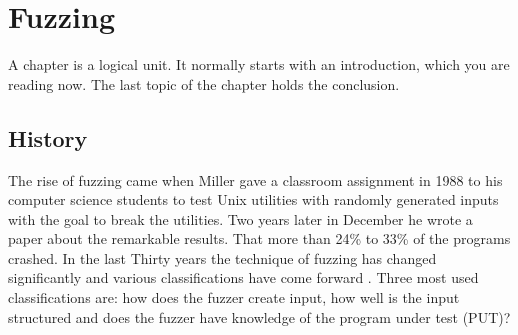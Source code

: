 \chapter{Fuzzing}
\label{cha:2:fuzzing}
A chapter is a logical unit. It normally starts with an introduction, which
you are reading now. The last topic of the chapter holds the conclusion.

%


\section{History} 
The rise of fuzzing came when Miller gave a classroom assignment \cite{21FuzzingAssignment} in 1988 to his computer science students to test Unix utilities with randomly generated inputs with the goal to break the utilities. Two years later in December he wrote a paper \cite{4originalFuzzingUnixUtils} about the remarkable results. That more than 24\% to 33\% of the programs crashed.
In the last Thirty years the technique of fuzzing has changed significantly and various classifications have come forward \cite{12Fuzzingasurvey} \cite{13manes2019survey}. Three most used classifications are: 
how does the fuzzer create input, how well is the input structured and does the fuzzer have knowledge of the program under test (PUT)?



